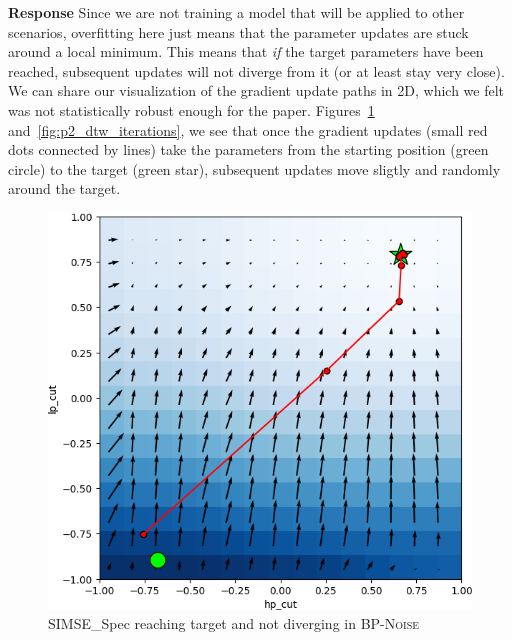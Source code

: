\documentclass[11pt]{article}
\newcommand{\BPNoise}{\textsc{BP-Noise}}
\begin{document}
\noindent\textbf{Response} 
Since we are not training a model that will be applied to other scenarios, overfitting here just means that the parameter updates are stuck around a local minimum. This means that \textit{if} the target parameters have been reached, subsequent updates will not diverge from it (or at least stay very close). We can share our visualization of the gradient update paths in 2D, which we felt was not statistically robust enough for the paper. Figures~\ref{fig:p0_simse_iterations} and~\ref{fig:p2_dtw_iterations}, we see that once the gradient updates (small red dots connected by lines) take the parameters from the starting position (green circle) to the target (green star), subsequent updates move sligtly and randomly around the target. 


\begin{figure}[h]
    \centering
    \begin{minipage}[t]{0.48\textwidth}
        \centering
        \includegraphics[width=\linewidth]{images/experiment_plots/p0_SIMSE_Spec.png}
        \caption{SIMSE\_Spec reaching target and not diverging in \BPNoise}
        \label{fig:p0_simse_iterations}
    \end{minipage}%
    \hfill
    \begin{minipage}[t]{0.48\textwidth}
        \centering

\end{minipage}
\end{figure}
\end{document}

